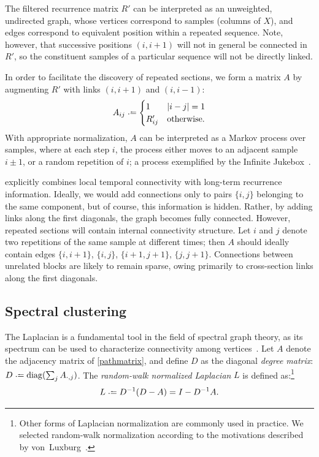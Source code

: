 \documentclass{article}
\begin{document}
The filtered recurrence matrix $R'$ can be interpreted as an unweighted, undirected 
graph, whose vertices correspond to samples (columns of $X$), and edges correspond 
to equivalent position within a repeated sequence. Note, however, that successive 
positions $(i, i+1)$ will not in general be connected in $R'$, so the constituent 
samples of a particular sequence will not be directly linked.

In order to facilitate the discovery of repeated sections, we form a matrix $A$ by 
augmenting $R'$ with links $(i, i+1)$ and $(i, i-1)$:
\begin{equation}
A_{ij} \defeq \begin{cases}
1 & |i - j| = 1\\
R'_{ij} & \text{otherwise}.
\end{cases}\label{pathmatrix}
\end{equation}
With appropriate normalization, $A$ can be interpreted as a Markov process
over samples, where at each step $i$, the process either moves to an adjacent
sample $i\pm1$, or a random repetition of $i$; a process exemplified by the 
Infinite Jukebox~\cite{infinitejukebox}.

 explicitly combines local temporal connectivity with long-term
recurrence information.  Ideally, we would add connections only to pairs $\{i,j\}$
belonging to the same component, but of course, this information is hidden.  Rather,
by adding links along the first diagonals, the graph becomes fully connected.  
However, repeated sections will contain internal connectivity structure.  Let $i$ and
$j$ denote two repetitions of the same sample at different times; then $A$ should
ideally contain edges $\{i, i+1\}$, $\{i, j\}$, $\{i+1, j+1\}$, $\{j, j+1\}$.
Connections between unrelated blocks are likely to remain sparse, owing primarily to
cross-section links along the first diagonals.  


\subsection{Spectral clustering}

The Laplacian is a fundamental tool in the field of spectral graph
theory, as its spectrum can be used to characterize 
connectivity among vertices~\cite{chung1997spectral}.  
Let $A$ denote the adjacency matrix of \cref{pathmatrix}, and define $D$ as the
diagonal \emph{degree matrix}: $D \defeq \diag(\sum_{j} A_{\cdot, j})$.  The
\emph{random-walk normalized Laplacian} $L$ is defined as:\footnote{Other forms of
Laplacian normalization are commonly used in practice.  We selected random-walk
normalization according to the motivations described by 
von~Luxburg~\cite{von2007tutorial}.}
\begin{equation}
L \defeq D^{-1} (D - A) = I - D^{-1} A.\label{rwlaplacian}
\end{equation}
\end{document}
